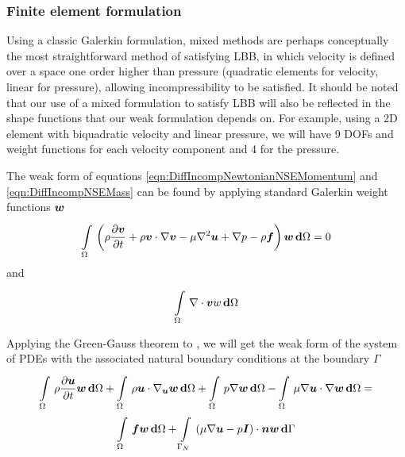 \subsubsection{Finite element formulation}

Using a classic Galerkin formulation, mixed methods are perhaps conceptually
the most straightforward method of satisfying LBB, in which velocity is
defined over a space one order higher than pressure (\eg quadratic elements
for velocity, linear for pressure), allowing incompressibility to be
satisfied. It should be noted that our use of a mixed formulation to satisfy
LBB will also be reflected in the shape functions that our weak formulation
depends on. For example, using a 2D element with biquadratic velocity and
linear pressure, we will have 9 DOFs and weight functions for each velocity
component and 4 for the pressure.

The weak form of equations \ref{eqn:DiffIncompNewtonianNSEMomentum} and
\ref{eqn:DiffIncompNSEMass} can be found by applying standard Galerkin weight
functions $\boldsymbol{w}$ \ie
\begin{equation}
  \gint{\Omega}{}{\pbrac{\rho\delby{\vectr{v}}{t}+\dotprod{\rho\vectr{v}}{\gradient{}{\vectr{v}}}
      -\mu\laplacian{}{\vectr{u}}+\gradient{}{p}
      -\rho\vectr{f}}{\vectr{w}}}{\Omega} = 0
 \label{eqn:BasicGalerkinNSEMomentum}
\end{equation}
and
\begin{equation}
  \gint{\Omega}{}{\divergence{}{\vectr{v}}w}{\Omega}
 \label{eqn:BasicGalerkinNSEMass}
\end{equation}

Applying the Green-Gauss theorem to , we will get the weak form of the system of PDEs with the
associated natural boundary conditions at the boundary $\Gamma$ \ie
\begin{multline}
  \gint{\Omega}{}{\rho\delby{\vectr{u}}{t}{\vectr{w}}}{\Omega}
 +\gint{\Omega}{}{\dotprod{\rho\vectr{u}}{\gradient{\vectr{u}}}\vectr{w}}{\Omega}
 +\gint{\Omega}{}{p\gradient{}{\vectr{w}}}{\Omega}
 -\gint{\Omega}{}{\dotprod{\mu\gradient{}{\vectr{u}}}{\gradient{}{\vectr{w}}}}{\Omega}=\\
 \gint{\Omega}{}{\vectr{f}\vectr{w}}{\Omega}
 +\gint{\Gamma_{N}}{}{\dotprod{\pbrac{\mu\gradient{}{\vectr{u}}-p\vectr{I}}}{\vectr{n}}\vectr{w}}{\Gamma}
 \label{eqn:GalerkinNSE}
\end{multline}

